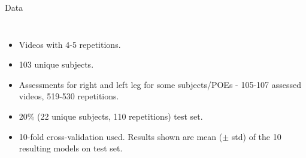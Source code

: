 \begin{frame}[fragile]{Data}
\begin{columns}[c]
    \begin{itemize}
      \small
      \item Videos with 4-5 repetitions.
      \item 103 unique subjects.
      \item Assessments for right and left leg for some subjects/POEs - 105-107 assessed videos, 519-530 repetitions.
      \item 20\% (22 unique subjects, 110 repetitions) test set.
      \item 10-fold cross-validation used. Results shown are mean ($\pm$ std) of the 10 resulting models on test set.
    \end{itemize}
  \end{columns}

\end{frame}

